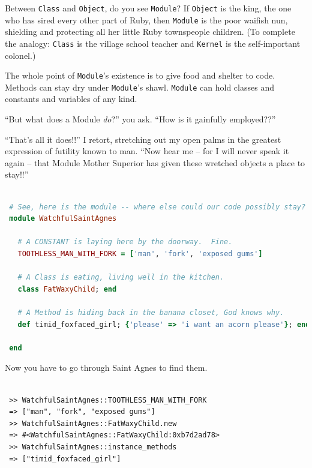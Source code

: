 \documentclass[10pt,twoside]{report}
\begin{document}
Between \lstinline[breaklines=true]|Class| and
\lstinline[breaklines=true]|Object|, do you see
\lstinline[breaklines=true]|Module|?  If
\lstinline[breaklines=true]|Object| is the king, the one who has sired
every other part of Ruby, then \lstinline[breaklines=true]|Module| is
the poor waifish nun, shielding and protecting all her little Ruby
townspeople children.  (To complete the analogy:
\lstinline[breaklines=true]|Class| is the village school teacher and
\lstinline[breaklines=true]|Kernel| is the self-important colonel.)

The whole point of \lstinline[breaklines=true]|Module|'s existence is
to give food and shelter to code.  Methods can stay dry under
\lstinline[breaklines=true]|Module|'s shawl.
\lstinline[breaklines=true]|Module| can hold classes and constants and
variables of any kind.

``But what does a Module {\em do}?'' you ask.  ``How is it gainfully
employed??''

``That's all it does!!'' I retort, stretching out my open palms in the
greatest expression of futility known to man.  ``Now hear me -- for I
will never speak it again -- that Module Mother Superior has given
these wretched objects a place to stay!!''


\begin{lstlisting}[basicstyle=\ttfamily\color{basiccolor},
    commentstyle = \ttfamily\color{commentcolor},
    keywordstyle=\ttfamily\color{keywordscolor},
    stringstyle=\color{stringcolor},
    language=Ruby,
    basicstyle=\small\ttfamily,
    showstringspaces=false,
  ]

 # See, here is the module -- where else could our code possibly stay?
 module WatchfulSaintAgnes

   # A CONSTANT is laying here by the doorway.  Fine.
   TOOTHLESS_MAN_WITH_FORK = ['man', 'fork', 'exposed gums']

   # A Class is eating, living well in the kitchen.
   class FatWaxyChild; end

   # A Method is hiding back in the banana closet, God knows why.
   def timid_foxfaced_girl; {'please' => 'i want an acorn please'}; end

 end

\end{lstlisting}


Now you have to go through Saint Agnes to find them.


\begin{lstlisting}

 >> WatchfulSaintAgnes::TOOTHLESS_MAN_WITH_FORK
 => ["man", "fork", "exposed gums"]
 >> WatchfulSaintAgnes::FatWaxyChild.new
 => #<WatchfulSaintAgnes::FatWaxyChild:0xb7d2ad78>
 >> WatchfulSaintAgnes::instance_methods
 => ["timid_foxfaced_girl"]

\end{lstlisting}
\end{document}
